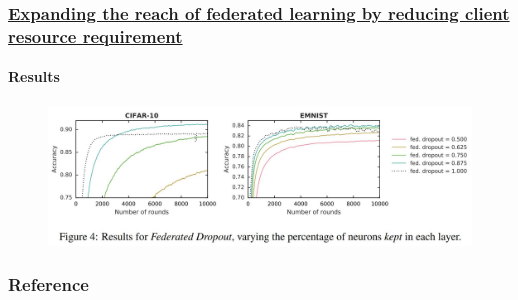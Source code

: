 \documentclass[10pt]{beamer}
\begin{document}
    \begin{frame}
        
        \frametitle{
            \href{https://arxiv.org/pdf/1812.07210.pdf}{
            Expanding the reach of federated learning by reducing client resource requirement
            }
        }

        \framesubtitle{
            Results
        }


        \begin{figure}
            \includegraphics[width=\textwidth]{src/img/DpR2.JPG}
        \end{figure}

    \end{frame}

    \begin{frame}
        \frametitle{
            Reference
        }
        
        \nocite{*}
        

    \end{frame}
\end{document}
